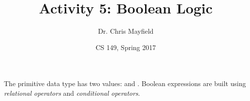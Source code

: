 \documentclass[12pt]{article}
\title{Activity 5: Boolean Logic}
\author{Dr. Chris Mayfield}
\date{CS 149, Spring 2017}
\begin{document}
\maketitle

The primitive data type  has two values:  and .
Boolean expressions are built using \emph{relational operators} and \emph{conditional operators}.



\newpage

\newpage

\end{document}
